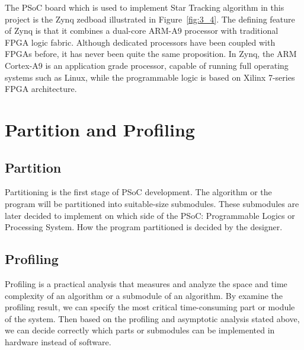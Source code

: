 
\noindent The PSoC board which is used to implement Star Tracking algorithm in this project is the Zynq zedboad illustrated in Figure~\ref{fig:3_4}. The defining feature of Zynq is that it combines a dual-core ARM-A9 processor with traditional FPGA logic fabric\cite{Xilinx}. Although dedicated processors have been coupled with FPGAs before, it has never been quite the same proposition. In Zynq, the ARM Cortex-A9 is an application grade processor, capable of running full operating systems such as Linux, while the programmable logic is based on Xilinx 7-series FPGA architecture. \\


\section{Partition and Profiling}

\subsection{Partition}

Partitioning is the first stage of PSoC development. The algorithm or the program will be partitioned into suitable-size submodules. These submodules are later decided to implement on which side of the PSoC: Programmable Logics or Processing System. How the program partitioned is decided by the designer. \\


\subsection{Profiling}

Profiling is a practical analysis that measures and analyze the space and time complexity of an algorithm or a submodule of an algorithm. By examine the profiling result, we can specify the most critical time-consuming part or module of the system. Then based on the profiling and asymptotic analysis stated above, we can decide correctly which parts or submodules can be implemented in hardware instead of software. \\

